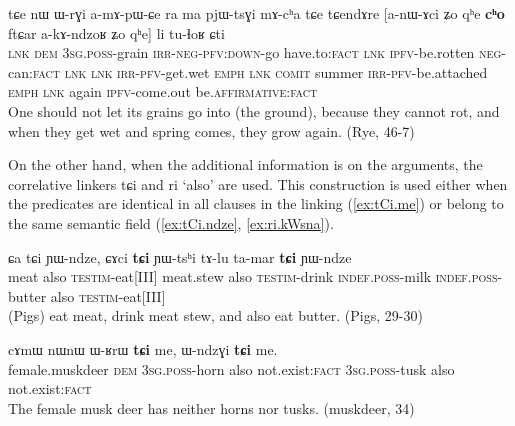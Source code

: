 \documentclass[oldfontcommands,oneside,a4paper,11pt]{article}
\newcommand{\ipa}[1]{{\phon \mbox{#1}}} %
\newcommand{\refb}[1]{(\ref{#1})}
\begin{document}
\begin{exe}
\ex \label{ex:Zo.qhe.cho}
\gll
\ipa{tɕe}  	\ipa{nɯ}  	\ipa{ɯ-rɣi}  	\ipa{a-mɤ-pɯ-ɕe}  	\ipa{ra}  	\ipa{ma}  	\ipa{pjɯ-tsɣi}  	\ipa{mɤ-cʰa}  	\ipa{tɕe}  \ipa{tɕendɤre}  	[\ipa{a-nɯ-ɤci}  	\ipa{ʑo}  	\ipa{qʰe}  	\ipa{\textbf{cʰo}}  	\ipa{ftɕar}  	\ipa{a-kɤ-ndzoʁ}  	\ipa{ʑo}  	\ipa{qʰe}]  	\ipa{li}  	\ipa{tu-ɬoʁ}  	\ipa{ɕti}  \\
\textsc{lnk} \textsc{dem} \textsc{3sg.poss}-grain \textsc{irr-neg-pfv:down}-go have.to:\textsc{fact} \textsc{lnk} \textsc{ipfv}-be.rotten \textsc{neg}-can:\textsc{fact} \textsc{lnk} \textsc{lnk} \textsc{irr-pfv}-get.wet \textsc{emph} \textsc{lnk} \textsc{comit} summer \textsc{irr-pfv}-be.attached \textsc{emph} \textsc{lnk} again \textsc{ipfv}-come.out be.\textsc{affirmative}:\textsc{fact} \\
\glt One should not let its grains go into (the ground), because they cannot rot, and when they get wet and   spring comes, they grow again. (Rye, 46-7)
\end{exe}

On the other hand, when the additional information is on the arguments, the correlative linkers \ipa{tɕi} and \ipa{ri} `also' are used. This construction is used either when the predicates are identical in all clauses in the linking \refb{ex:tCi.me} or belong to the same semantic field (\ref{ex:tCi.ndze}, \ref{ex:ri.kWsna}).

 \begin{exe}
\ex \label{ex:tCi.ndze}
\gll
\ipa{ɕa}  	\ipa{tɕi}  	\ipa{ɲɯ-ndze,}  	\ipa{ɕɤci}  	\ipa{\textbf{tɕi}}  	\ipa{ɲɯ-tsʰi}  	\ipa{tɤ-lu}  	\ipa{ta-mar}  	\ipa{\textbf{tɕi}}  	\ipa{ɲɯ-ndze}  \\
meat also \textsc{testim}-eat[III] meat.stew also \textsc{testim}-drink  \textsc{indef.poss}-milk \textsc{indef.poss}-butter also \textsc{testim}-eat[III] \\
\glt  (Pigs) eat meat, drink meat stew, and also eat butter. (Pigs, 29-30)
\end{exe}


 \begin{exe}
\ex \label{ex:tCi.me}
\gll
\ipa{cɤmɯ}  	\ipa{nɯnɯ}  	\ipa{ɯ-ʁrɯ}  	\ipa{\textbf{tɕi}}  	\ipa{me,}  	\ipa{ɯ-ndzɣi}  	\ipa{\textbf{tɕi}}  	\ipa{me.}  \\
female.muskdeer \textsc{dem} \textsc{3sg.poss}-horn also not.exist:\textsc{fact} \textsc{3sg.poss}-tusk also not.exist:\textsc{fact} \\
\glt The female musk deer has neither horns nor tusks.  (muskdeer, 34)
\end{exe}
\end{document}
